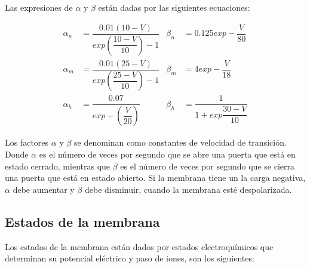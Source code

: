 Las expresiones de \(\alpha\) y \(\beta\) están dadas por las siguientes ecuaciones:

\begin{align*}
\alpha_{n}&=\dfrac{0.01(10-V)}{exp(\dfrac{10-V}{10})-1}           &  \beta_{n}&=0.125exp-\dfrac{V}{80}\\
\alpha_{m}&=\dfrac{0.01(25-V)}{exp(\dfrac{25-V}{10})-1}                    &  \beta_{m}&=4exp-\dfrac{V}{18}\\
\alpha_{h}&=\dfrac{0.07}{exp-(\dfrac{V}{20})}              &  \beta_{h}&=\dfrac{1}{1+exp\dfrac{30-V}{10}}
\end{align*}

Los factores \(\alpha\) y \(\beta\) se denominan como constantes de velocidad de transición. Donde \(\alpha\) es el número de veces por segundo que se abre una puerta que está en estado cerrado, mientras que \(\beta\) es el número de veces por segundo que se cierra una puerta que está en estado abierto. Si la membrana tiene un la carga negativa, \(\alpha\) debe aumentar y \(\beta\) debe disminuir, cuando la membrana esté despolarizada.

\subsection{Estados de la membrana}

Los estados de la membrana están dados por estados electroquímicos que determinan su potencial eléctrico y paso de iones, son los siguientes: 

